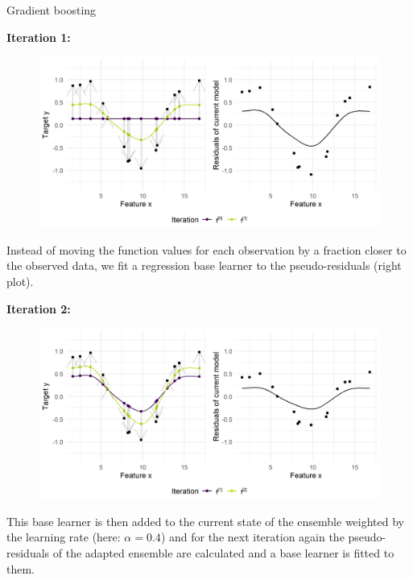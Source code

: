\begin{vbframe}{Gradient boosting}
\begin{footnotesize}
\vspace*{0.1cm}
\textbf{Iteration 1:}
\begin{figure}
  \includegraphics[width=\textwidth]{figure/fig-gb-concept-idea-1.png}
\end{figure}
\end{footnotesize}
\framebreak
\begin{footnotesize}
Instead of moving the function values for each observation by a fraction closer to the observed data, we fit a regression base learner to the pseudo-residuals (right plot). 


\vspace*{0.1cm}
\textbf{Iteration 2:}
\begin{figure}
  \includegraphics[width=\textwidth]{figure/fig-gb-concept-idea-2.png}
\end{figure}
\end{footnotesize}
\framebreak
\begin{footnotesize}
This base learner is then added to the current state of the ensemble weighted by the learning rate (here: $\alpha = 0.4$) and for the next iteration again the pseudo-residuals of the adapted ensemble are calculated and a base learner is fitted to them.



\end{footnotesize}
\end{vbframe}
